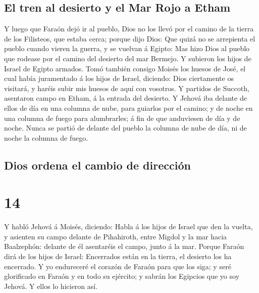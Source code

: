 \hypertarget{el-tren-al-desierto-y-el-mar-rojo-a-etham}{%
\subsection{El tren al desierto y el Mar Rojo a
Etham}\label{el-tren-al-desierto-y-el-mar-rojo-a-etham}}

 Y luego que Faraón dejó ir al pueblo, Dios no los llevó
por el camino de la tierra de los Filisteos, que estaba cerca; porque
dijo Dios: Que quizá no se arrepienta el pueblo cuando vieren la guerra,
y se vuelvan á Egipto:  Mas hizo Dios al pueblo que
rodease por el camino del desierto del mar Bermejo. Y subieron los hijos
de Israel de Egipto armados.  Tomó también consigo Moisés
los huesos de José, el cual había juramentado á los hijos de Israel,
diciendo: Dios ciertamente os visitará, y haréis subir mis huesos de
aquí con vosotros.  Y partidos de Succoth, asentaron
campo en Etham, á la entrada del desierto.  Y Jehová iba
delante de ellos de día en una columna de nube, para guiarlos por el
camino; y de noche en una columna de fuego para alumbrarles; á fin de
que anduviesen de día y de noche.  Nunca se partió de
delante del pueblo la columna de nube de día, ni de noche la columna de
fuego.

\hypertarget{dios-ordena-el-cambio-de-direcciuxf3n}{%
\subsection{Dios ordena el cambio de
dirección}\label{dios-ordena-el-cambio-de-direcciuxf3n}}

\hypertarget{section-02-14}{%
\section{14}\label{section-02-14}}

 Y habló Jehová á Moisés, diciendo:  Habla á
los hijos de Israel que den la vuelta, y asienten su campo delante de
Pihahiroth, entre Migdol y la mar hacia Baalzephón: delante de él
asentaréis el campo, junto á la mar.  Porque Faraón dirá
de los hijos de Israel: Encerrados están en la tierra, el desierto los
ha encerrado.  Y yo endureceré el corazón de Faraón para
que los siga; y seré glorificado en Faraón y en todo su ejército; y
sabrán los Egipcios que yo soy Jehová. Y ellos lo hicieron así.

